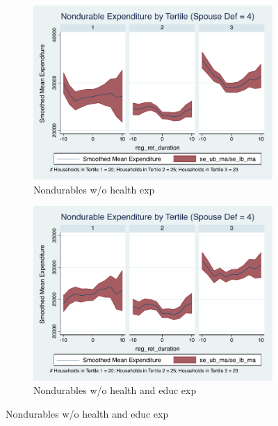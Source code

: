 \documentclass[11pt,onecolumn]{article}
\numberwithin{figure}{section}
\begin{document}
\begin{figure}
  \begin{subfigure}{0.5\textwidth}
  \centering
 	\includegraphics[width=0.9\linewidth]{../ConsumptionPostRetirement_by_SpouseDef/Smoothed_xhealth/spouse_def_4.pdf}
    \caption{Nondurables w/o health exp}
    \label{fig:chapter001_dist_001}
  \end{subfigure}
  	\hspace{1cm}
  \begin{subfigure}{0.5\textwidth}
 	\includegraphics[width=0.9\linewidth]{../ConsumptionPostRetirement_by_SpouseDef/Smoothed_xhealth_educ/spouse_def_4.pdf}
    \caption{Nondurables w/o health and educ exp}
    \label{fig:chapter001_reward_001}
  \end{subfigure}
\end{figure}
\clearpage
\end{document}
